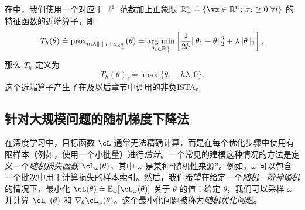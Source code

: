 \documentclass[../../book-main.tex]{subfiles}
\begin{document}
\begin{example}\label{example:prox-of-nonnegative-l1}
    在中，我们使用一个对应于 \(\ell^{1}\) 范数加上正象限 \(\R_{+}^{n} \doteq \{\vx \in \R^{n} \colon x_{i} \geq 0\ \forall i\}\) 的特征函数的近端算子，即
    \begin{equation}
        T_{h}(\theta) \doteq \prox_{h, \lambda\norm{\cdot}_{1} + \chi_{\R_{+}^{n}}}(\theta) = \argmin_{\theta_{1} \in \R_{+}^{n}}\bs{\frac{1}{2h}\norm{\theta_{1} - \theta}_{2}^{2} + \lambda\norm{\theta}_{1}},
    \end{equation}
    那么 \(T_{h}\) 定义为
    \begin{equation}
        T_{h}(\theta)_{i} \doteq \max\{\theta_{i} - h\lambda, 0\}.
    \end{equation}
    这个近端算子产生了在及以后章节中调用的非负ISTA。
\end{example}



\subsection{针对大规模问题的随机梯度下降法}


在深度学习中，目标函数 \(\cL\) 通常无法精确计算，而是在每个优化步骤中使用有限样本（例如，使用一个小批量）进行\textit{估计}。一个常见的建模这种情况的方法是定义一个\textit{随机损失函数} \(\cL_{\omega}(\theta)\)，其中 \(\omega\) 是某种“随机性来源”。例如，\(\omega\) 可以包含一个批次中用于计算损失的样本索引。然后，我们希望在给定一个\textit{随机一阶神谕机}的情况下，最小化 \(\cL(\theta) \doteq \Ex_{\omega}[\cL_{\omega}(\theta)]\) 关于 \(\theta\) 的值：给定 \(\theta\)，我们可以采样 \(\omega\) 并计算 \(\cL_{\omega}(\theta)\) 和 \(\nabla_{\theta}\cL_{\omega}(\theta)\)。这个最小化问题被称为\textit{随机优化问题}。
\end{document}
